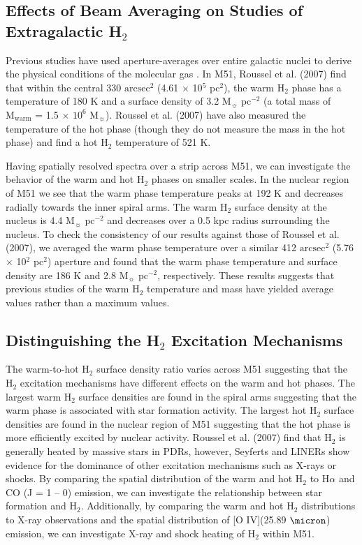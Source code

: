 \documentclass[manuscript]{aastex}
\begin{document}
\subsection{Effects of Beam Averaging on Studies of Extragalactic H$_2$}

Previous studies have used aperture-averages over entire galactic
nuclei to derive the physical conditions of the molecular gas
\citep{rig02, hig06, rou07}.  In M51, Roussel et al. (2007) find that within
the central 330 $\mathrm{arcsec^2}$ (4.61 $\times$ 10$^5$ pc$^2$),
the warm H$_2$ phase has a temperature of 180 K and 
a surface density of 3.2 $\mathrm{M_\sun}$ $\mathrm{pc^{-2}}$ 
(a total mass of $\mathrm{M_{warm}}$ = 1.5 $\times$ $\mathrm{10^6}$
$\mathrm{M_\sun}$).  Roussel et al. (2007) have also measured the temperature of
the hot phase (though they do not measure the mass in the hot phase)
and find a hot H$_2$ temperature of 521 K.

Having spatially resolved spectra over a strip across M51, we can 
investigate the behavior of the warm and hot H$_2$ phases 
on smaller scales.  In the nuclear region of M51 we see that the 
warm phase temperature peaks at 192 K and decreases 
radially towards the inner spiral arms.  The warm H$_2$ surface 
density at the nucleus is 4.4 $\mathrm{M_\sun}$ $\mathrm{pc^{-2}}$ 
and decreases over a 0.5 kpc radius surrounding the 
nucleus.  To check the consistency of 
our results against those of Roussel et al. (2007), we averaged the 
warm phase temperature over a similar 412 
$\mathrm{arcsec^2}$ (5.76 $\times$ 10$^2$ pc$^2$) aperture and
found that the warm phase temperature and surface density are
186 K and 2.8 $\mathrm{M_\sun}$ $\mathrm{pc^{-2}}$, 
respectively.  These results suggests that previous studies 
of the warm H$_2$ temperature and mass have yielded average 
values rather than a maximum values.

\subsection{Distinguishing the H$_2$ Excitation Mechanisms}

The warm-to-hot H$_2$ surface density ratio varies across 
M51 suggesting that the H$_2$ excitation mechanisms 
have different effects on the warm and hot phases. 
The largest warm H$_2$ surface densities are found in 
the spiral arms suggesting that the warm phase is 
associated with star formation activity.  The largest 
hot H$_2$ surface densities are found in the nuclear 
region of M51 suggesting that the hot phase is more 
efficiently excited by nuclear activity. Roussel et al. (2007) 
find that H$_2$ is generally heated by massive stars in 
PDRs, however, Seyferts and LINERs show evidence for 
the dominance of other excitation mechanisms such as 
X-rays or shocks.  By comparing the spatial distribution 
of the warm and hot H$_2$ to H$\alpha$ and CO 
(J = 1 -- 0) emission, we can investigate the relationship 
between star formation and H$_2$.  Additionally, by 
comparing the warm and hot H$_2$ distributions to X-ray 
observations and the spatial distribution of [O IV](25.89 $\micron$) 
emission, we can investigate X-ray and shock heating 
of H$_2$ within M51.
\end{document}
